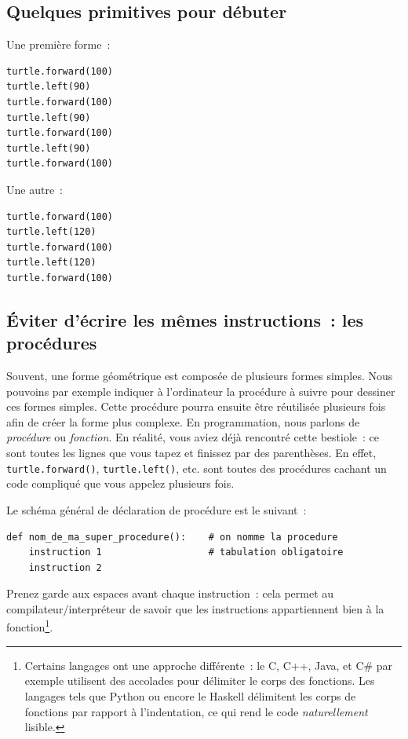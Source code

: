 \documentclass[11pt,a4paper]{article}
\begin{document}
\subsection{Quelques primitives pour débuter}
Une première forme~:

\begin{lstlisting}
turtle.forward(100)
turtle.left(90)
turtle.forward(100)
turtle.left(90)
turtle.forward(100)
turtle.left(90)
turtle.forward(100)
\end{lstlisting}

Une autre~:

\begin{lstlisting}
turtle.forward(100)
turtle.left(120)
turtle.forward(100)
turtle.left(120)
turtle.forward(100)
\end{lstlisting}

\subsection{Éviter d'écrire les mêmes instructions~: les procédures}

Souvent, une forme géométrique est composée de plusieurs formes simples. Nous
pouvoins par exemple indiquer à l'ordinateur la procédure à suivre pour dessiner
ces formes simples. Cette procédure pourra ensuite être réutilisée plusieurs
fois afin de créer la forme plus complexe. En programmation, nous parlons de
\emph{procédure} ou \emph{fonction}. En réalité, vous aviez déjà rencontré cette
bestiole~: ce sont toutes les lignes que vous tapez et finissez par des
parenthèses. En effet, \lstinline{turtle.forward()}, \lstinline{turtle.left()},
etc. sont toutes des procédures cachant un code compliqué que vous appelez
plusieurs fois.

Le schéma général de déclaration de procédure est le suivant~:

\begin{lstlisting}
def nom_de_ma_super_procedure():    # on nomme la procedure
    instruction 1                   # tabulation obligatoire
    instruction 2
\end{lstlisting}

Prenez garde aux espaces avant chaque instruction~: cela permet au
compilateur/interpréteur de savoir que les instructions appartiennent
bien à la fonction\footnote{Certains langages ont une approche différente~: le
C, C++, Java, et C\# par exemple utilisent des accolades pour délimiter le corps
des fonctions. Les langages tels que Python ou encore le Haskell délimitent les
corps de fonctions par rapport à l'indentation, ce qui rend le code
\emph{naturellement} lisible.}.
\end{document}
